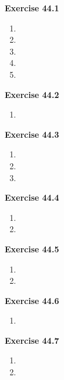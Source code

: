 




\textbf{Exercise 44.1}
\begin{enumerate}
    \item 
    \item 
    \item 
    \item 
    \item 
\end{enumerate}

\textbf{Exercise 44.2}
\begin{enumerate}
    \item 
\end{enumerate}

\textbf{Exercise 44.3}
\begin{enumerate}
    \item 
    \item 
    \item 
\end{enumerate}

\textbf{Exercise 44.4}
\begin{enumerate}
    \item 
    \item 
\end{enumerate}

\textbf{Exercise 44.5}
\begin{enumerate}
    \item 
    \item 
\end{enumerate}

\textbf{Exercise 44.6}
\begin{enumerate}
    \item 
\end{enumerate}

\textbf{Exercise 44.7}
\begin{enumerate}
    \item 
    \item 
\end{enumerate}

